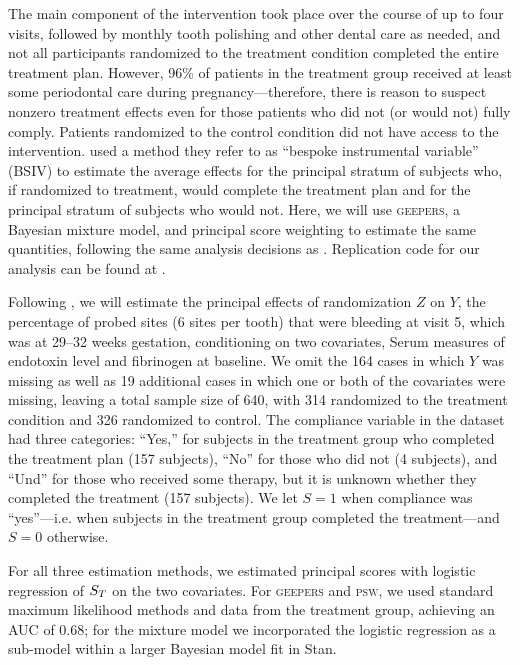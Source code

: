 \documentclass[]{article}
\begin{document}
The main component of the intervention took place over the course of up to four visits, followed by monthly tooth polishing and other dental care as needed, and not all participants randomized to the treatment condition completed the entire treatment plan.
However, 96\% of patients in the treatment group received at least some periodontal care during pregnancy---therefore, there is reason to suspect nonzero treatment effects even for those patients who did not (or would not) fully comply.
Patients randomized to the control condition did not have access to the intervention.
\citet{richardson2023estimating} used a method they refer to as ``bespoke instrumental variable'' (BSIV) to estimate the average effects for the principal stratum of subjects who, if randomized to treatment,  would complete the treatment plan and for the principal stratum of subjects who would not.
Here, we will use \textsc{geepers}, a Bayesian mixture model, and principal score weighting to estimate the same quantities, following the same analysis decisions as \citet{richardson2023estimating}.
Replication code for our analysis can be found at \url{}.

Following \citep{richardson2023estimating}, we will estimate the principal effects of randomization $Z$ on $Y$, the percentage of probed sites (6 sites per tooth) that were bleeding at visit 5, which was at 29--32 weeks gestation, conditioning on two covariates, Serum measures of endotoxin level and fibrinogen at baseline.
We omit the 164 cases in which $Y$ was missing as well as 19 additional cases in which one or both of the covariates were missing, leaving a total sample size of 640, with 314 randomized to the treatment condition and 326 randomized to control.
The compliance variable in the dataset had three categories: ``Yes,'' for subjects in the treatment group who completed the treatment plan (157 subjects), ``No'' for those who did not (4 subjects), and ``Und'' for those who received some therapy, but it is unknown whether they completed the treatment (157 subjects).
We let $S=1$ when compliance was ``yes''---i.e. when subjects in the treatment group completed the treatment---and $S=0$ otherwise.

For all three estimation methods, we estimated principal scores with logistic regression of $S_T$ on the two covariates.
For \textsc{geepers} and \textsc{psw}, we used standard maximum likelihood methods and data from the treatment group, achieving an AUC of 0.68; for the mixture model we incorporated the logistic regression as a sub-model within a larger Bayesian model fit in Stan.
\end{document}
